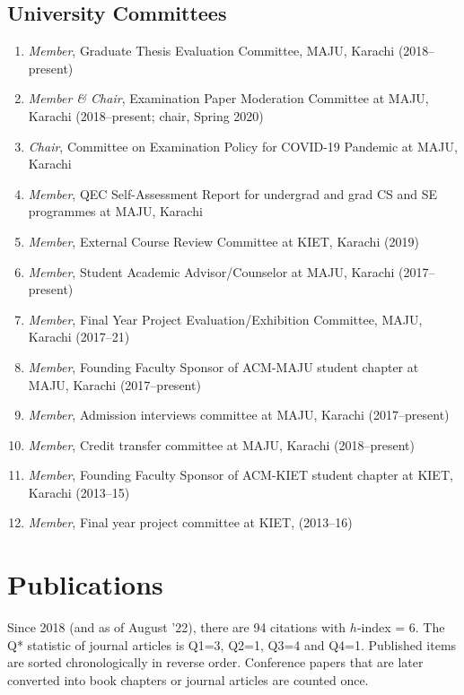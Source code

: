 \documentclass[10pt]{article}
\begin{document}
\subsection*{University Committees}
\begin{enumerate}
\itemsep=-.25em
    \item \emph{Member}, Graduate Thesis Evaluation Committee, MAJU, Karachi (2018–present)
    
    \item \emph{Member \& Chair}, Examination Paper Moderation Committee at MAJU, Karachi (2018–present; chair, Spring 2020)
    
    \item \emph{Chair}, Committee on Examination Policy for COVID-19 Pandemic at MAJU, Karachi
    
    \item \emph{Member}, QEC Self-Assessment Report for undergrad and grad CS and SE programmes at MAJU, Karachi
    
    \item \emph{Member}, External Course Review Committee at KIET, Karachi (2019)
    
    \item \emph{Member}, Student Academic Advisor/Counselor at MAJU, Karachi (2017–present)
    
    \item \emph{Member}, Final Year Project Evaluation/Exhibition Committee, MAJU, Karachi (2017–21)
    
    \item \emph{Member}, Founding Faculty Sponsor of ACM-MAJU student chapter at MAJU, Karachi (2017–present)
    
    \item \emph{Member}, Admission interviews committee at MAJU, Karachi (2017–present)
    
    \item \emph{Member}, Credit transfer committee at MAJU, Karachi (2018–present)
    
    \item \emph{Member}, Founding Faculty Sponsor of ACM-KIET student chapter at KIET, Karachi (2013–15)
    
    \item \emph{Member}, Final year project committee at KIET, (2013–16)
\end{enumerate}

\section*{Publications}
Since 2018 (and as of August '22), there are 94 citations with $h$-index = 6. The Q* statistic of journal articles is Q1=3, Q2=1, Q3=4 and Q4=1. Published items are sorted chronologically in reverse order. Conference papers that are later converted into book chapters or journal articles are counted once.
\end{document}
